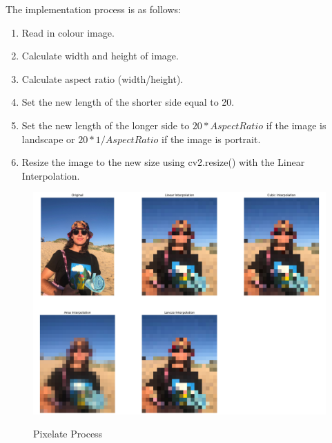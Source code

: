 \documentclass[a4paper,10pt]{report}
\begin{document}
	The implementation process is as follows:
		\begin{enumerate}[Step 1:]
		\item Read in colour image.
		\item Calculate width and height of image.
		\item Calculate aspect ratio (width/height).
		\item Set the new length of the shorter side equal to 20.
		\item Set the new length of the longer side to $20 * AspectRatio$ if the image is landscape or $20 * 1/AspectRatio$ if the image is portrait.
		\item Resize the image to the new size using cv2.resize() with the Linear Interpolation.
	\end{enumerate}

	\begin{figure}[h]
		\caption{Pixelate Process}
		\centering
		\includegraphics[width=\linewidth]{../Images/Process/Effect3_Pixelate.jpg}
		\label{Process_Pixelate}
	\end{figure}
	
	
	
	
\end{document}
